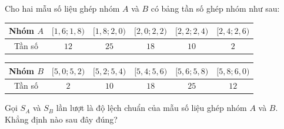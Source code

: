 \begin{ex}
Cho hai mẫu số liệu ghép nhóm $A$ và $B$ có bảng tần số ghép nhóm như sau:
\begin{center}
\renewcommand{\arraystretch}{1.25}
\begin{tabular}{|c|c|c|c|c|c|}
\hline
Nhóm $A$ & $[1{,}6;1{,}8)$ & $[1{,}8;2{,}0)$ & $[2{,}0;2{,}2)$ & $[2{,}2;2{,}4)$ & $[2{,}4;2{,}6)$ \\
\hline
Tần số & $12$ & $25$ & $18$ & $10$ & $2$ \\
\hline
\end{tabular}

\medskip
\begin{tabular}{|c|c|c|c|c|c|}
\hline
Nhóm $B$ & $[5{,}0;5{,}2)$ & $[5{,}2;5{,}4)$ & $[5{,}4;5{,}6)$ & $[5{,}6;5{,}8)$ & $[5{,}8;6{,}0)$ \\
\hline
Tần số & $2$ & $10$ & $18$ & $25$ & $12$ \\
\hline
\end{tabular}
\end{center}
Gọi $S_A$ và $S_B$ lần lượt là độ lệch chuẩn của mẫu số liệu ghép nhóm $A$ và $B$. Khẳng định nào sau đây đúng?
\end{ex}
